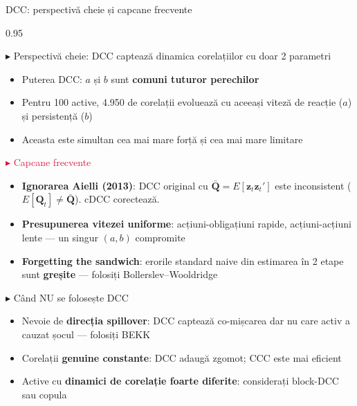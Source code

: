\documentclass[9pt, aspectratio=169, t]{beamer}
\begin{document}

\begin{frame}{DCC: perspectivă cheie și capcane frecvente}
    \begin{cminipage}{0.95\textwidth}
    \vspace{-3mm}
    {\scriptsize
    \begin{block}{\textcolor{MainBlue}{$\blacktriangleright$ Perspectivă cheie}: DCC captează dinamica corelațiilor cu doar 2 parametri}
        \begin{itemize}\setlength{\itemsep}{0pt}
            \item Puterea DCC: $a$ și $b$ sunt \textbf{comuni tuturor perechilor}
            \item Pentru 100 active, 4.950 de corelații evoluează cu aceeași viteză de reacție ($a$) și persistență ($b$)
            \item Aceasta este simultan cea mai mare forță și cea mai mare limitare
        \end{itemize}
    \end{block}
    \vspace{-2mm}
    \begin{alertblock}{\textcolor{Crimson}{$\blacktriangleright$ Capcane frecvente}}
        \begin{itemize}\setlength{\itemsep}{0pt}
            \item \textbf{Ignorarea Aielli (2013)}: DCC original cu $\bar{\mathbf{Q}} = E[\mathbf{z}_t\mathbf{z}_t']$ este inconsistent ($E[\mathbf{Q}_t] \neq \bar{\mathbf{Q}}$). cDCC corectează.
            \item \textbf{Presupunerea vitezei uniforme}: acțiuni-obligațiuni rapide, acțiuni-acțiuni lente --- un singur $(a,b)$ compromite
            \item \textbf{Forgetting the sandwich}: erorile standard naive din estimarea în 2 etape sunt \textbf{greșite} --- folosiți Bollerslev--Wooldridge
        \end{itemize}
    \end{alertblock}
    \vspace{-2mm}
    \begin{exampleblock}{\textcolor{Forest}{$\blacktriangleright$ Când NU se folosește DCC}}
        \begin{itemize}\setlength{\itemsep}{0pt}
            \item Nevoie de \textbf{direcția spillover}: DCC captează co-mișcarea dar nu care activ a cauzat șocul --- folosiți BEKK
            \item Corelații \textbf{genuine constante}: DCC adaugă zgomot; CCC este mai eficient
            \item Active cu \textbf{dinamici de corelație foarte diferite}: considerați block-DCC sau copula
        \end{itemize}
    \end{exampleblock}
    }
    \end{cminipage}
\end{frame}
\end{document}
